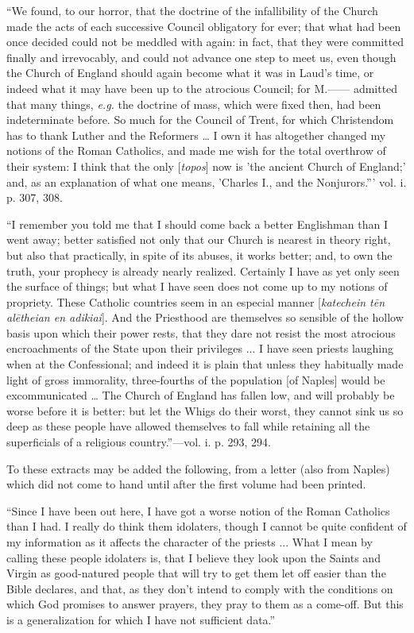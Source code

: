 ``We found, to our horror, that
the doctrine of the infallibility of the Church made the acts of each
successive Council obligatory for ever; that what had been once
decided could not be meddled with again: in fact, that they were
committed finally and irrevocably, and could not advance one step to
meet us, even though the Church of England should again become what it
was in Laud's time, or indeed what it may have been up to the
atrocious Council; for M.—— admitted that many things, \emph{e.g.}
the doctrine of mass, which were fixed then, had been
indeterminate before. So much for the Council of Trent, for which
Christendom has to thank Luther and the Reformers … I own it has
altogether changed my notions of the Roman Catholics, and made me wish
for the total overthrow of their system: I think that the only [\emph{topos}]
now is 'the ancient Church of England;' and, as an explanation of what
one means, 'Charles I., and the Nonjurors.''' vol. i. p. 307, 308.

``I remember you told me that I
should come back a better Englishman than I went away; better
satisfied not only that our Church is nearest in theory right, but
also that practically, in spite of its abuses, it works better; and,
to own the truth, your prophecy is already nearly realized. Certainly
I have as yet only seen the surface of things; but what I have seen
does not come up to my notions of propriety. These Catholic countries
seem in an especial manner [\emph{katechein t\={e}n al\={e}theian
en adikiai}]. And the Priesthood are themselves so sensible of the
hollow basis upon which their power rests, that they dare not resist
the most atrocious encroachments of the State upon their privileges
... I have seen priests laughing when at the Confessional; and indeed
it is plain that unless they habitually made light of gross
immorality, three-fourths of the population [of Naples] would be
excommunicated … The Church of England has fallen low, and will
probably be worse before it is better: but let the Whigs do their
worst, they cannot sink us so deep as these people have allowed
themselves to fall while retaining all the superficials of a religious
country.''—vol. i. p. 293, 294.

To these extracts may be added
the following, from a letter (also from Naples) which did not come to
hand until after the first volume had been printed.

``Since I have been out here, I
have got a worse notion of the Roman Catholics than I had. I really do
think them idolaters, though I cannot be quite confident of my
information as it affects the character of the priests ... What I mean
by calling these people idolaters is, that I believe they look upon
the Saints and Virgin as good-natured people that will try to get them
let off easier than the Bible declares, and that, as they don't intend
to comply with the conditions on which God promises to answer prayers,
they pray to them as a come-off. But this is a generalization
for which I have not sufficient data.''

